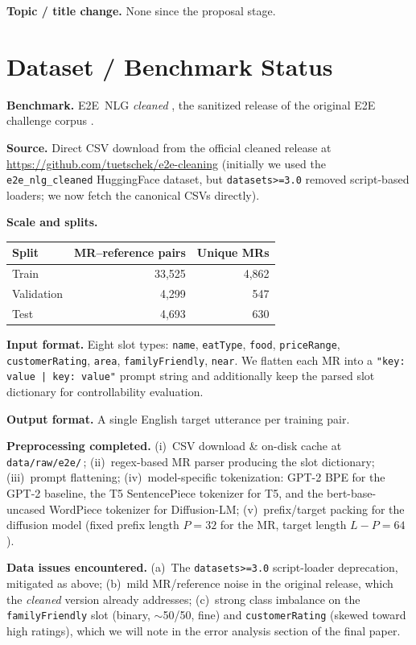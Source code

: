 \documentclass[11pt,a4paper]{article}
\begin{document}
\textbf{Topic / title change.} None since the proposal stage.

\section{Dataset / Benchmark Status}

\textbf{Benchmark.} E2E~NLG \emph{cleaned} \cite{dusek2019semantic}, the
sanitized release of the original E2E challenge corpus
\cite{novikova2017e2e}.

\textbf{Source.} Direct CSV download from the official cleaned release at
\url{https://github.com/tuetschek/e2e-cleaning} (initially we used the
\texttt{e2e\_nlg\_cleaned} HuggingFace dataset, but \texttt{datasets>=3.0}
removed script-based loaders; we now fetch the canonical CSVs directly).

\textbf{Scale and splits.}
\begin{center}
\begin{tabular}{lrr}
\toprule
Split & MR--reference pairs & Unique MRs \\
\midrule
Train      & 33{,}525 & 4{,}862 \\
Validation & 4{,}299  & 547    \\
Test       & 4{,}693  & 630    \\
\bottomrule
\end{tabular}
\end{center}

\textbf{Input format.} Eight slot types: \texttt{name}, \texttt{eatType},
\texttt{food}, \texttt{priceRange}, \texttt{customerRating}, \texttt{area},
\texttt{familyFriendly}, \texttt{near}. We flatten each MR into a
\texttt{"key: value | key: value"} prompt string and additionally keep the
parsed slot dictionary for controllability evaluation.

\textbf{Output format.} A single English target utterance per training pair.

\textbf{Preprocessing completed.}
(i)~CSV download \& on-disk cache at \texttt{data/raw/e2e/}\,;
(ii)~regex-based MR parser producing the slot dictionary;
(iii)~prompt flattening;
(iv)~model-specific tokenization: GPT-2 BPE for the GPT-2 baseline, the T5
SentencePiece tokenizer for T5, and the bert-base-uncased WordPiece tokenizer
for Diffusion-LM;
(v)~prefix/target packing for the diffusion model (fixed prefix length
$P\!=\!32$ for the MR, target length $L-P\!=\!64$).

\textbf{Data issues encountered.}
(a)~The \texttt{datasets>=3.0} script-loader deprecation, mitigated as above;
(b)~mild MR/reference noise in the original release, which the
\emph{cleaned} version already addresses;
(c)~strong class imbalance on the \texttt{familyFriendly} slot (binary,
$\sim$50/50, fine) and \texttt{customerRating} (skewed toward high ratings),
which we will note in the error analysis section of the final paper.
\end{document}
